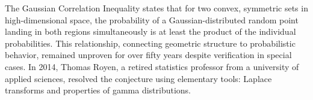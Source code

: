 The Gaussian Correlation Inequality states that for two convex, symmetric sets in high-dimensional space, the probability of a Gaussian-distributed random point landing in both regions simultaneously is at least the product of the individual probabilities. This relationship, connecting geometric structure to probabilistic behavior, remained unproven for over fifty years despite verification in special cases. In 2014, Thomas Royen, a retired statistics professor from a university of applied sciences, resolved the conjecture using elementary tools: Laplace transforms and properties of gamma distributions.
